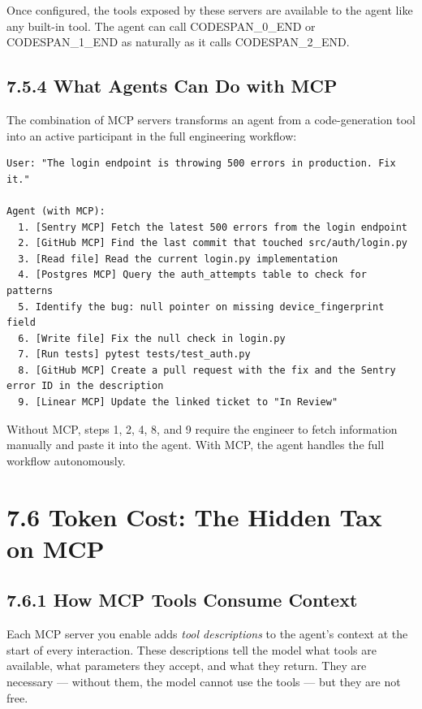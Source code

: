 \documentclass[11pt,a4paper]{book}
\begin{document}
Once configured, the tools exposed by these servers are available to the agent like any built-in tool. The agent can call CODESPAN\_0\_END or CODESPAN\_1\_END as naturally as it calls CODESPAN\_2\_END.

\subsection{7.5.4 What Agents Can Do with MCP}

The combination of MCP servers transforms an agent from a code-generation tool into an active participant in the full engineering workflow:

\begin{lstlisting}
User: "The login endpoint is throwing 500 errors in production. Fix it."

Agent (with MCP):
  1. [Sentry MCP] Fetch the latest 500 errors from the login endpoint
  2. [GitHub MCP] Find the last commit that touched src/auth/login.py
  3. [Read file] Read the current login.py implementation
  4. [Postgres MCP] Query the auth_attempts table to check for patterns
  5. Identify the bug: null pointer on missing device_fingerprint field
  6. [Write file] Fix the null check in login.py
  7. [Run tests] pytest tests/test_auth.py
  8. [GitHub MCP] Create a pull request with the fix and the Sentry error ID in the description
  9. [Linear MCP] Update the linked ticket to "In Review"
\end{lstlisting}

Without MCP, steps 1, 2, 4, 8, and 9 require the engineer to fetch information manually and paste it into the agent. With MCP, the agent handles the full workflow autonomously.

\medskip

\section{7.6 Token Cost: The Hidden Tax on MCP}

\subsection{7.6.1 How MCP Tools Consume Context}

Each MCP server you enable adds \textit{tool descriptions} to the agent's context at the start of every interaction. These descriptions tell the model what tools are available, what parameters they accept, and what they return. They are necessary --- without them, the model cannot use the tools --- but they are not free.
\end{document}
